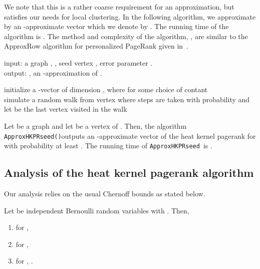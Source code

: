 \documentclass[runningheads,a4paper]{llncs}
\newcommand{\hkprseedalg}{\texttt{ApproxHKPRseed}}
\newcommand{\hkprseedalgparams}{\texttt{ApproxHKPRseed()}}
\begin{document}
We note that this is a rather coarse requirement for an approximation, but
satisfies our needs for local clustering.  In the following algorithm, we
approximate  by an -approximate vector which we denote by
.  The running time of the algorithm is .  The
method and complexity of the algorithm, , are similar to the
ApproxRow algorithm for personalized PageRank given
in~\cite{bbct:sublinearpr:waw12}.

\begin{algorithm}[H]
\caption*{\hkprseedalgparams}
\label{alg:hkprseed}
input: a graph , , seed vertex , error parameter .\\
output: , an -approximation of .\\
\begin{algorithmic}
  \State initialize a -vector  of dimension , where 
  \State 
  \State  for some choice of contant \\
    \Start
      \State simulate a  random walk from vertex  where  steps are taken with probability  and 
      \State let  be the last vertex visited in the walk
      \State 
    \End
  \EndFor\\
  \State
  \Return   
\end{algorithmic} 
\end{algorithm}

\begin{theorem}\label{thm:hkpraccuracy}
Let  be a graph and let  be a vertex of .  Then, the algorithm
\hkprseedalgparams outputs an -approximate vector  of the
heat kernel pagerank  for  with probability at least
.  The running time of \hkprseedalg~is .
\end{theorem}

\subsection{Analysis of the heat kernel pagerank algorithm}
\label{sec:hkpranalysis}
Our analysis relies on the usual Chernoff bounds as stated below.

\begin{lemma}\label{lem:chernoff}
Let  be independent Bernoulli random variables with .  Then, 
\begin{enumerate}
\item for , 
\item for , 
\item for , .
\end{enumerate}
\end{lemma}
\end{document}
